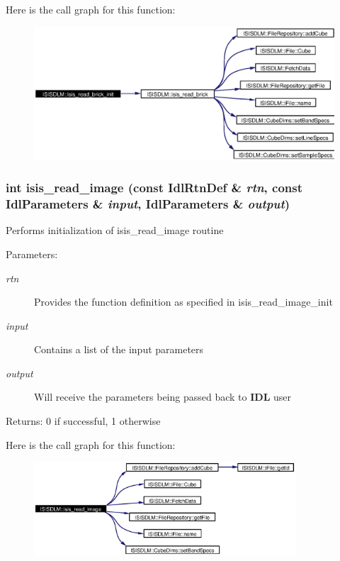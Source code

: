 Here is the call graph for this function:\begin{figure}[H]
\begin{center}
\leavevmode
\includegraphics[width=376pt]{namespaceISISDLM_a30_cgraph}
\end{center}
\end{figure}
\subsubsection{\setlength{\rightskip}{0pt plus 5cm}int isis\_\-read\_\-image (const Idl\-Rtn\-Def \& {\em rtn}, const Idl\-Parameters \& {\em input}, Idl\-Parameters \& {\em output})}\label{namespaceISISDLM_a33}


Performs initialization of isis\_\-read\_\-image routine \begin{Desc}
\item[Parameters:]
\begin{description}
\item[{\em rtn}]Provides the function definition as specified in isis\_\-read\_\-image\_\-init \item[{\em input}]Contains a list of the input parameters \item[{\em output}]Will receive the parameters being passed back to {\bf IDL} user \end{description}
\end{Desc}
\begin{Desc}
\item[Returns:]0 if successful, 1 otherwise \end{Desc}


Here is the call graph for this function:\begin{figure}[H]
\begin{center}
\leavevmode
\includegraphics[width=277pt]{namespaceISISDLM_a33_cgraph}
\end{center}
\end{figure}
